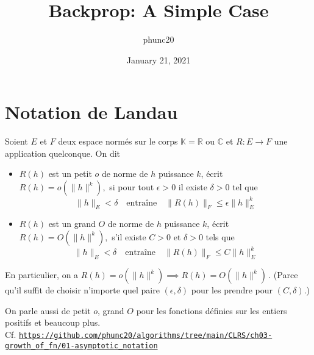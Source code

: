 \documentclass{article}
\author{phunc20}
\title{Backprop: A Simple Case}
\date{January 21, 2021}
\begin{document}


\section{Notation de Landau}
Soient $E$ et $F$ deux espace normés sur le corps $\mathbb{K} = \mathbb{R}$ ou $\mathbb{C}$
et $R: E \to F$ une application quelconque. On dit
\begin{itemize}
  \item $R(h)$ est un petit $o$ de norme de $h$ puissance $k$, écrit $R(h) = o(\lVert h \rVert^{k}),$ si
    pour tout $\epsilon > 0$ il existe $\delta > 0$ tel que
    $$
      \lVert h \rVert_{E} < \delta \quad\text{entraîne}\quad \lVert R(h) \rVert_{F} \le \epsilon \lVert h \rVert_{E}^{k}
    $$

  \item $R(h)$ est un grand $O$ de norme de $h$ puissance $k$, écrit $R(h) = O(\lVert h \rVert^{k}),$
    s'il existe $C > 0$ et $\delta > 0$ tels que
    $$
      \lVert h \rVert_{E} < \delta \quad\text{entraîne}\quad \lVert R(h) \rVert_{F} \le C \lVert h \rVert_{E}^{k}
    $$
\end{itemize}

En particulier, on a $R(h) = o(\lVert h \rVert^{k}) \implies R(h) = O(\lVert h \rVert^{k})\,.$ (Parce qu'il
suffit de choisir n'importe quel paire $(\epsilon, \delta)$ pour les prendre pour $(C, \delta)$.)

On parle aussi de petit $o$, grand $O$ pour les fonctions définies sur les entiers positifs et beaucoup plus.\\
Cf.
\href{https://github.com/phunc20/algorithms/tree/main/CLRS/ch03-growth\_of\_fn/01-asymptotic\_notation}{\texttt{https://github.com/phunc20/algorithms/tree/main/CLRS/ch03-growth\_of\_fn/01-asymptotic\_notation}}
\end{document}
